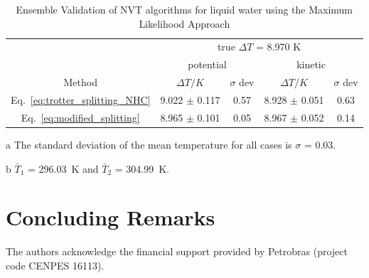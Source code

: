\documentclass[aip,jcp,reprint,amsmath,amssymb]{revtex4-1}
\begin{document}
\begin{table}
	\begin{threeparttable}
		\caption{Ensemble Validation of NVT algorithms for liquid water using the Maximum Likelihood Approach  }
		\label{table:ensemblevalidation}
		\begin{ruledtabular}
			\begin{tabular}{ccccc}
				& \multicolumn{4}{c}{true $\Delta T$ = 8.970 K} \\
				\cline{2-5}
				& \multicolumn{2}{c}{potential} & \multicolumn{2}{c}{kinetic}\\
				\hline
				Method  &$\Delta T/K$ & $\sigma$ dev & $\Delta T/K$ & $\sigma$ dev \\
				\hline %
				Eq.~\eqref{eq:trotter_splitting_NHC} & 9.022 $\pm$ 0.117 & 0.57 & 8.928 $\pm$ 0.051 & 0.63 \\
				Eq.~\eqref{eq:modified_splitting}    & 8.965 $\pm$ 0.101 & 0.05 & 8.967 $\pm$ 0.052 & 0.14
		\end{tabular}
		\end{ruledtabular}
		\begin{tablenotes}
			\item[a] The standard deviation of the mean temperature for all cases is $\sigma$ = 0.03.
			\item[b] $\bar{T}_1$ = 296.03~K and $\bar{T}_2$ = 304.99~K.
		\end{tablenotes}
	\end{threeparttable}
\end{table}



\section{Concluding Remarks}
\label{sec:conclusion}

\begin{acknowledgments}
The authors acknowledge the financial support provided by Petrobras (project code CENPES 16113).
\end{acknowledgments}
\end{document}
